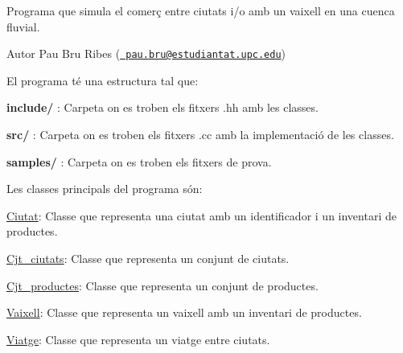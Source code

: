 Programa que simula el comerç entre ciutats i/o amb un vaixell en una cuenca fluvial.\begin{DoxyAuthor}{Autor}
Pau Bru Ribes (\href{mailto:pau.bru@estudiantat.upc.edu}{\texttt{ pau.\+bru@estudiantat.\+upc.\+edu}})
\end{DoxyAuthor}
El programa té una estructura tal que\+:
\begin{DoxyItemize}
\item {\bfseries{include/}} \+: Carpeta on es troben els fitxers .hh amb les classes.
\item {\bfseries{src/}} \+: Carpeta on es troben els fitxers .cc amb la implementació de les classes.
\item {\bfseries{samples/}} \+: Carpeta on es troben els fitxers de prova.
\end{DoxyItemize}

Les classes principals del programa són\+:
\begin{DoxyItemize}
\item \mbox{\hyperlink{classCiutat}{Ciutat}}\+: Classe que representa una ciutat amb un identificador i un inventari de productes.
\item \mbox{\hyperlink{classCjt__ciutats}{Cjt\+\_\+ciutats}}\+: Classe que representa un conjunt de ciutats.
\item \mbox{\hyperlink{classCjt__productes}{Cjt\+\_\+productes}}\+: Classe que representa un conjunt de productes.
\item \mbox{\hyperlink{classVaixell}{Vaixell}}\+: Classe que representa un vaixell amb un inventari de productes.
\item \mbox{\hyperlink{classViatge}{Viatge}}\+: Classe que representa un viatge entre ciutats. 
\end{DoxyItemize}